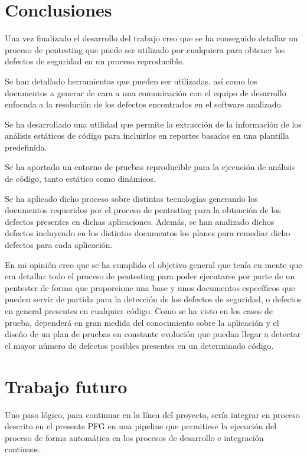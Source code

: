 \section{Conclusiones} 
Una vez finalizado el desarrollo del trabajo creo que se ha conseguido detallar un proceso de pentesting que puede ser 
utilizado por cualquiera para obtener los defectos de seguridad en un proceso reproducible.

Se han detallado herramientas que pueden ser utilizadas, así como los documentos a generar de cara a una comunicación con 
el equipo de desarrollo enfocada a la resolución de los defectos encontrados en el software analizado.

Se ha desarrollado una utilidad que permite la extracción de la información de los análisis estáticos de código 
para incluirlos en reportes basados en una plantilla predefinida.

Se ha aportado un entorno de pruebas reproducible para la ejecución de análisis de código, tanto estático como dinámicos.

Se ha aplicado dicho proceso sobre distintas tecnologías generando los documentos requeridos por el proceso de pentesting 
para la obtención de los defectos presentes en dichas aplicaciones. Además, se han analizado dichos defectos 
incluyendo en los distintos documentos los planes para remediar dicho defectos para cada aplicación.

En mi opinión creo que se ha cumplido el objetivo general que tenía en mente que era detallar todo el proceso de pentesting
para poder ejecutarse por parte de un pentester de forma que proporcione una base y unos documentos 
específicos que pueden servir de partida para la detección de los defectos de seguridad, o defectos en general 
presentes en cualquier código. Como se ha visto en los casos de prueba, dependerá en gran medida del conocimiento 
sobre la aplicación y el diseño de un plan de pruebas en constante evolución que puedan llegar a detectar el 
mayor número de defectos posibles presentes en un determinado código.

\newpage
\section{Trabajo futuro} 

Uno paso lógico, para continuar en la línea del proyecto, sería integrar en proceso descrito en el presente PFG en una \gls{pipeline}
que permitiese la ejecución del proceso de forma automática en los procesos de desarrollo e integración continuos.

